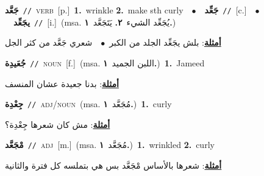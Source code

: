\documentclass[10pt,a4paper,twoside]{article} %
\begin{document}
\begin{multicols}{2}
{\setlength\topsep{0pt}\textbf{\foreignlanguage{arabic}{جَعَّد}}\ {\color{gray}\texttt{//}\color{black}}\ \textsc{verb}\ [p.]\ \textbf{1.}~wrinkle  \textbf{2.}~make sth curly\ \ $\bullet$\ \ \setlength\topsep{0pt}\textbf{\foreignlanguage{arabic}{جَعِّد}}\ {\color{gray}\texttt{//}\color{black}}\ [c.]\ \ $\bullet$\ \ \setlength\topsep{0pt}\textbf{\foreignlanguage{arabic}{يجَعِّد}}\ {\color{gray}\texttt{//}\color{black}}\ [i.]\ \color{gray}(msa. \foreignlanguage{arabic}{يُجَعِّد الشيء}~\foreignlanguage{arabic}{\textbf{٢.}}  \foreignlanguage{arabic}{يَتَجَعَّد}~\foreignlanguage{arabic}{\textbf{١.}})\color{black}\  \begin{flushright}\color{gray}\foreignlanguage{arabic}{\textbf{\underline{\foreignlanguage{arabic}{أمثلة}}}: بلش يجَعِّد الجلد من الكبر\ $\bullet$\ \  شعري جَعَّد من كثر الجل}\end{flushright}\color{black}} \vspace{2mm}

{\setlength\topsep{0pt}\textbf{\foreignlanguage{arabic}{جُعَيدِة}}\ {\color{gray}\texttt{//}\color{black}}\ \textsc{noun}\ [f.]\ \color{gray}(msa. \foreignlanguage{arabic}{اللبن الجميد}~\foreignlanguage{arabic}{\textbf{١.}})\color{black}\ \textbf{1.}~Jameed\  \begin{flushright}\color{gray}\foreignlanguage{arabic}{\textbf{\underline{\foreignlanguage{arabic}{أمثلة}}}: بدنا جعيدة عشان المنسف}\end{flushright}\color{black}} \vspace{2mm}

{\setlength\topsep{0pt}\textbf{\foreignlanguage{arabic}{جِعْدِة}}\ {\color{gray}\texttt{//}\color{black}}\ \textsc{adj/noun}\ \color{gray}(msa. \foreignlanguage{arabic}{مُجَعَّد}~\foreignlanguage{arabic}{\textbf{١.}})\color{black}\ \textbf{1.}~curly\  \begin{flushright}\color{gray}\foreignlanguage{arabic}{\textbf{\underline{\foreignlanguage{arabic}{أمثلة}}}: مش كان شعرها جِعْدِة؟}\end{flushright}\color{black}} \vspace{2mm}

{\setlength\topsep{0pt}\textbf{\foreignlanguage{arabic}{مْجَعَّد}}\ {\color{gray}\texttt{//}\color{black}}\ \textsc{adj}\ [m.]\ \color{gray}(msa. \foreignlanguage{arabic}{مُجَعَّد}~\foreignlanguage{arabic}{\textbf{١.}})\color{black}\ \textbf{1.}~wrinkled  \textbf{2.}~curly\  \begin{flushright}\color{gray}\foreignlanguage{arabic}{\textbf{\underline{\foreignlanguage{arabic}{أمثلة}}}: شعرها بالأساس مْجَعَّد بس هي بتملسه كل فترة والثانية}\end{flushright}\color{black}} \vspace{2mm}


\end{multicols}
\end{document}
